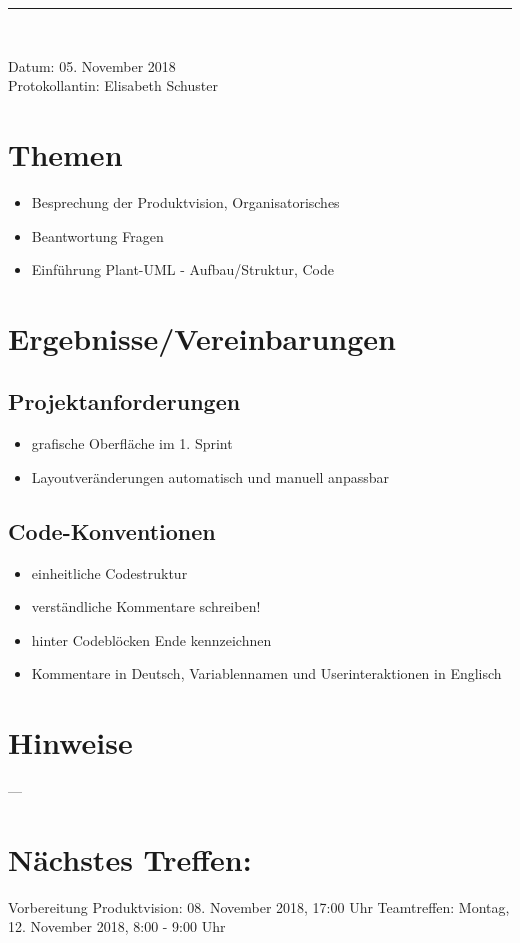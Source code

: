 \begin{center}  
\vspace{0.5pt}\nointerlineskip\rule{\textwidth}{0.2pt}\\ 
\vspace{0.5pt}\nointerlineskip
\end{center} 
\large Datum: 05. November 2018\vspace{3pt}\\\large Protokollantin: Elisabeth Schuster
\section*{Themen}
\begin{itemize}
\item Besprechung der Produktvision, Organisatorisches
\item Beantwortung Fragen
\item Einführung Plant-UML - Aufbau/Struktur, Code
\end{itemize}
\section*{Ergebnisse/Vereinbarungen}
\subsection*{Projektanforderungen}
\begin{itemize}
\item grafische Oberfläche im 1. Sprint
\item Layoutveränderungen automatisch und manuell anpassbar
\end{itemize}
\subsection*{Code-Konventionen}
\begin{itemize}
\item einheitliche Codestruktur
\item verständliche Kommentare schreiben!
\item hinter Codeblöcken Ende kennzeichnen
\item Kommentare in Deutsch, Variablennamen und Userinteraktionen in Englisch
\end{itemize}
\section*{Hinweise}
---
\section*{Nächstes Treffen:}
Vorbereitung Produktvision: 08. November 2018, 17:00 Uhr
Teamtreffen: Montag, 12. November 2018, 8:00 - 9:00 Uhr
